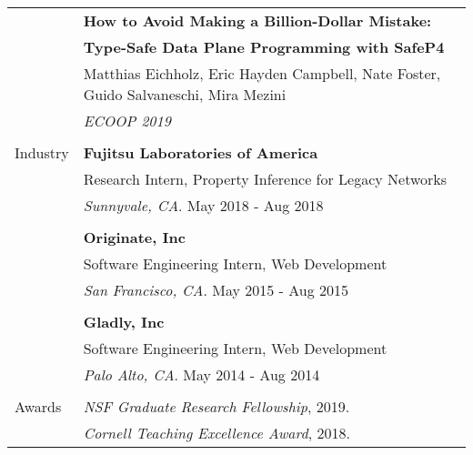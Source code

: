 \documentclass[letterpaper,10pt,oneside]{article}
\begin{document}
\begin{tabular}{@{} l l}
  & \textbf{How to Avoid Making a Billion-Dollar Mistake:}\\
  & \textbf{Type-Safe Data Plane Programming with SafeP4} \\
  & Matthias Eichholz, Eric Hayden Campbell, Nate Foster, Guido Salvaneschi, Mira Mezini \\
  & \textit{ECOOP 2019} \\
  & \\

 \Large{Industry}
  & \textbf{Fujitsu Laboratories of America} \\
  & Research Intern, Property Inference for Legacy Networks \\
  & \textit{Sunnyvale, CA}. May 2018 - Aug 2018 \\
  & \\
  & \textbf{Originate, Inc} \\
  & Software Engineering Intern, Web Development \\
  & \textit{San Francisco, CA}. May 2015 - Aug 2015 \\
  & \\
  & \textbf{Gladly, Inc} \\
  & Software Engineering Intern, Web Development \\
  & \textit{Palo Alto, CA}. May 2014 - Aug 2014 \\ \\
  \Large{Awards}
  & \textit{NSF Graduate Research Fellowship}, 2019. \\
  & \textit{Cornell Teaching Excellence Award}, 2018.

\end{tabular}
\end{document}
